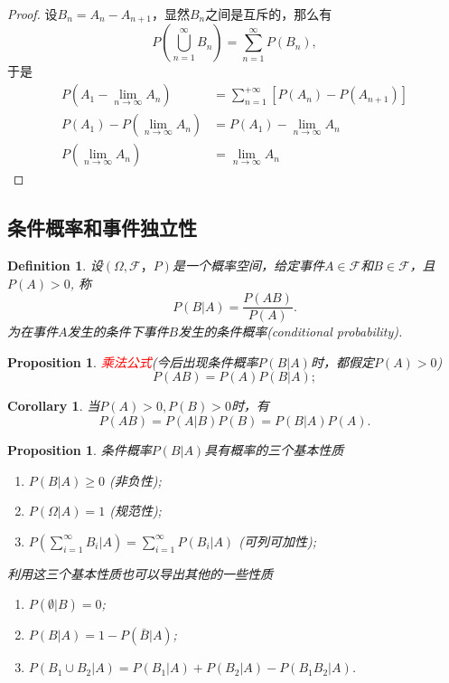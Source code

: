\documentclass{article}
\newtheorem{corollary}[theorem]{Corollary}
\newtheorem{proposition}[theorem]{Proposition}
\newtheorem{definition}[theorem]{Definition}
\newcommand{\redt}[1]{\textcolor{red}{#1}}
\begin{document}
\begin{proof}
设$B_n = A_n - A_{n+1}$，显然$B_n$之间是互斥的，那么有
$$
P(\bigcup\limits_{n=1}^\infty B_n) = \sum\limits_{n=1}^{\infty} P(B_n),
$$
于是
$$
\begin{array}{rl}
P(A_1-\lim\limits_{n \to \infty} A_n) &=  \sum\limits_{n=1}^{+\infty} \left[P(A_n)-P(A_{n+1})\right] \\
P(A_1)- P(\lim\limits_{n \to \infty} A_n) &= P(A_1) - \lim\limits_{n \to \infty} A_n \\
P(\lim\limits_{n \to \infty} A_n) &= \lim\limits_{n \to \infty} A_n
\end{array}
$$
\end{proof}


\newpage
\subsection{条件概率和事件独立性}

\begin{definition}
\rm 设$(\Omega,\mathscr{F}，P)$是一个概率空间，给定事件$A \in \mathscr{F}$和$B \in \mathscr{F}$，且$P(A) > 0$, 称
$$
P(B|A) = \frac{P(AB)}{P(A)}.
$$
为在事件$A$发生的条件下事件$B$发生的{\color{red}条件概率}(conditional probability).
\end{definition}

\begin{proposition}
\rm \redt{乘法公式}(今后出现条件概率$P(B|A)$时，都假定$P(A) > 0$)
$$
P(AB) = P(A)P(B|A);
$$
\end{proposition}

\begin{corollary}
\rm 当$P(A) > 0,P(B) > 0$时，有
$$
P(AB) = P(A|B)P(B) = P(B|A)P(A).
$$
\end{corollary}

\begin{proposition}
\rm 条件概率$P(B|A)$具有概率的三个基本性质
\begin{enumerate}
	\item $P(B|A) \geq 0$ (非负性);
	\item $P(\Omega|A) = 1$ (规范性);
	\item $P(\sum\limits_{i=1}^{\infty} B_i | A) = \sum\limits_{i=1}^{\infty}P(B_i | A)$ (可列可加性); 
\end{enumerate}

利用这三个基本性质也可以导出其他的一些性质
\begin{enumerate}
	\item $P(\emptyset | B) = 0$;
	\item $P(B|A) = 1 - P(\bar{B} | A)$;
	\item $P(B_1 \cup B_2 | A) = P(B_1 | A) + P(B_2 | A) - P(B_1B_2 |A)$. 
\end{enumerate}
\end{proposition}
\end{document}
